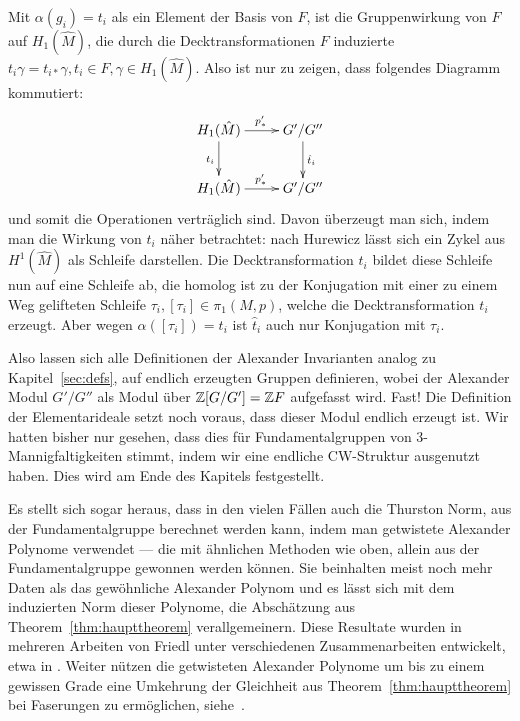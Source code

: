  Mit $\alpha(g_i)=t_i$ als ein Element der Basis von $F$, ist die Gruppenwirkung von $F$ auf $H_1(\hat M)$, die durch die Decktransformationen $F$ induzierte $t_i\gamma = t_{i*}\gamma,t_i \in F , \gamma \in H_1(\hat M)$. Also ist nur zu zeigen, dass folgendes Diagramm kommutiert:
\[
	\begin{xy}
		\xymatrix{H_1(\hat M) \ar[d]_{t_i} \ar[r]^{p'_*} & G'/G'' \ar[d]^{\hat t_i}\\
		H_1(\hat M)  \ar[r]^{p'_*} & G'/G'' }
	\end{xy}
\]
und somit die Operationen verträglich sind. Davon überzeugt man sich, indem man die Wirkung von $t_i$ näher betrachtet: nach Hurewicz lässt sich ein Zykel aus $H^1(\hat M)$ als Schleife darstellen. Die Decktransformation $t_i$ bildet diese Schleife nun auf eine Schleife ab, die homolog ist zu der Konjugation mit einer zu einem Weg gelifteten Schleife $\tau_i, [\tau_i] \in \pi_1(M,p)$, welche die Decktransformation $t_i$ erzeugt. Aber wegen $\alpha([\tau_i])=t_i$ ist $\hat t_i$ auch nur Konjugation mit $\tau_i$.

Also lassen sich alle Definitionen der Alexander Invarianten analog zu Kapitel~\ref{sec:defs}, auf endlich erzeugten Gruppen definieren, wobei der Alexander Modul $G'/G''$ als Modul über $\mathbb{Z} [G/G']= \mathbb{Z} F$ aufgefasst wird. Fast! Die Definition der Elementarideale setzt noch voraus, dass dieser Modul endlich erzeugt ist. Wir hatten bisher nur gesehen, dass dies für Fundamentalgruppen von 3-Mannigfaltigkeiten stimmt, indem wir eine endliche CW-Struktur ausgenutzt haben. Dies wird am Ende des Kapitels festgestellt.

\begin{bem}
Es stellt sich sogar heraus, dass in den vielen Fällen auch die Thurston Norm, aus der Fundamentalgruppe berechnet werden kann, indem man getwistete Alexander Polynome verwendet --- die mit ähnlichen Methoden wie oben, allein aus der Fundamentalgruppe gewonnen werden können. Sie beinhalten meist noch mehr Daten als das gewöhnliche Alexander Polynom und es lässt sich mit dem induzierten Norm dieser Polynome, die Abschätzung aus Theorem~\ref{thm:haupttheorem} verallgemeinern. Diese Resultate wurden in mehreren Arbeiten von Friedl unter verschiedenen Zusammenarbeiten entwickelt, etwa in \cite{Friedl.2011,Friedl.2008,Friedl.2008b,Friedl.2007,Friedl.2006,Friedl.2008c}. Weiter nützen die getwisteten Alexander Polynome um bis zu einem gewissen Grade eine Umkehrung der Gleichheit aus Theorem~\ref{thm:haupttheorem} bei Faserungen zu ermöglichen, siehe~\cite{Friedl.2006,Friedl.2008b}.
\end{bem}

